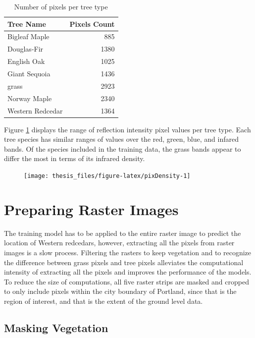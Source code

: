 \documentclass[12pt,twoside]{reedthesis}
\begin{document}
\begin{table}

\caption{\label{tab:pixelCounts}Number of pixels per tree type}
\centering
\begin{tabular}[t]{l|r}
\hline
Tree Name & Pixels Count\\
\hline
Bigleaf Maple & 885\\
\hline
Douglas-Fir & 1380\\
\hline
English Oak & 1025\\
\hline
Giant Sequoia & 1436\\
\hline
grass & 2923\\
\hline
Norway Maple & 2340\\
\hline
Western Redcedar & 1364\\
\hline
\end{tabular}
\end{table}
Figure \ref{fig:pixDensity} displays the range of reflection intensity pixel values per tree type. Each tree species has similar ranges of values over the red, green, blue, and infared bands. Of the species included in the training data, the grass bands appear to differ the most in terms of its infrared density.
\begin{figure}

{\centering \texttt{[image: thesis\_files/figure-latex/pixDensity-1]} 

}

\caption{ }\label{fig:pixDensity}
\end{figure}
\hypertarget{preparing-raster-images}{%
\section{Preparing Raster Images}\label{preparing-raster-images}}

The training model has to be applied to the entire raster image to predict the location of Western redcedars, however, extracting all the pixels from raster images is a slow process. Filtering the rasters to keep vegetation and to recognize the difference between grass pixels and tree pixels alleviates the computational intensity of extracting all the pixels and improves the performance of the models. To reduce the size of computations, all five raster strips are masked and cropped to only include pixels within the city boundary of Portland, since that is the region of interest, and that is the extent of the ground level data.

\hypertarget{masking-vegetation}{%
\subsection{Masking Vegetation}\label{masking-vegetation}}
\end{document}
